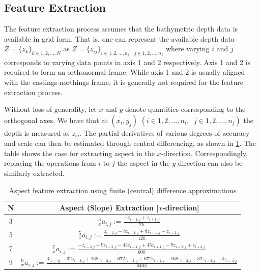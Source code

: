 			\FloatBarrier
	
		\subsection{Feature Extraction}
		\label{BenthicHabitatMapping:BathymetricFeatures:FeatureExtraction}
		
			The feature extraction process assumes that the bathymetric depth data is available in grid form. That is, one can represent the available depth data $Z = \{z_{k}\}_{k \in {1, 2, ..., N}}$ as $Z = \{z_{ij}\}_{i \in {1, 2, ..., n_{i}}, \;\; j \in {1, 2, ..., n_{j}}}$ where varying $i$ and $j$ corresponds to varying data points in axis 1 and 2 respectively. Axis 1 and 2 is required to form an orthonormal frame. While axis 1 and 2 is usually aligned with the eastings-northings frame, it is generally not required for the feature extraction process.
			
			Without loss of generality, let $x$ and $y$ denote quantities corresponding to the orthogonal axes. We have that at $(x_{i}, y_{j})$ $(i \in {1, 2, ..., n_{i}}, \;\; j \in {1, 2, ..., n_{j}})$ the depth is measured as $z_{ij}$. The partial derivatives of various degrees of accuracy and scale can then be estimated through central differencing, as shown in \cref{Table:AspectExtraction}. The table shows the case for extracting aspect in the $x$-direction. Correspondingly, replacing the operations from $i$ to $j$ the aspect in the $y$-direction can also be similarly extracted.
			
			\bgroup
			\def\arraystretch{2}%
			\begin{table}[h]
				\begin{center}
					\begin{tabular}{ c c }
						\hline
						\hline
						N & Aspect (Slope) Extraction [$x$-direction]\\
						\hline
						\hline
						3 & $^{3}_{x}a_{i, j} := \frac{- z_{i - 1, j} + z_{i + 1, j}}{2h}$ \\
						5 & $^{5}_{x}a_{i, j} := \frac{z_{i - 2, j} - 8 z_{i - 1, j} + 8 z_{i + 1, j} - z_{i + 2, j}}{12h}$ \\
						7 & $^{7}_{x}a_{i, j} := \frac{-z_{i - 3, j} + 9 z_{i - 2, j} - 45 z_{i - 1, j} + 45 z_{i + 1, j} - 9 z_{i + 2, j} + z_{i + 3, j}}{60h}$ \\
						9 & $^{9}_{x}a_{i, j} := \frac{3 z_{i - 4 j} - 32 z_{i - 3, j} + 168 z_{i - 2, j} - 672 z_{i - 1, j} + 672 z_{i + 1, j} - 168 z_{i + 2, j} + 32 z_{i + 3, j} - 3 z_{i + 4, j}}{840h}$ \\
						\hline
						\hline
					\end{tabular}
				\end{center}
		  	\caption{Aspect feature extraction using finite (central) difference approximations}
		  	\label{Table:AspectExtraction}			
		  	\end{table}	
	  		\egroup
	  		
